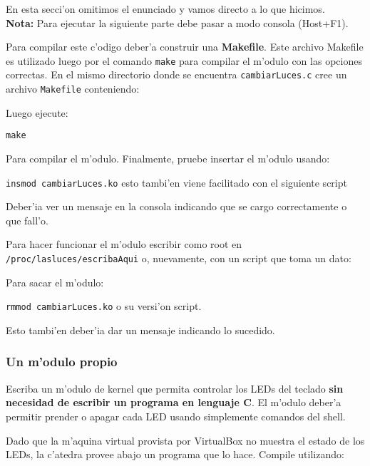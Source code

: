 \begin{envRespuesta}
En esta secci'on omitimos el enunciado y vamos directo a lo que hicimos. \\
\textbf{Nota:} Para ejecutar la siguiente parte debe pasar a modo consola (Host+F1).
\end{envRespuesta}


Para compilar este c'odigo deber'a construir una \textbf{Makefile}. Este archivo Makefile es utilizado luego por el
comando \texttt{make} para compilar el m'odulo con las opciones correctas. En el mismo directorio donde se encuentra
\texttt{cambiarLuces.c} cree un archivo \texttt{Makefile} conteniendo:


Luego ejecute:

\texttt{make}

Para compilar el m'odulo. Finalmente, pruebe insertar el m'odulo usando:

\texttt{insmod cambiarLuces.ko} esto tambi'en viene facilitado con el siguiente script

Deber'ia ver un mensaje en la consola indicando que se cargo correctamente o que fall'o.

Para hacer funcionar el m'odulo escribir como root en \texttt{/proc/lasluces/escribaAqui} o, nuevamente, con un script que toma un dato:


Para sacar el m'odulo:

\texttt{rmmod cambiarLuces.ko} o su versi'on script.


Esto tambi'en deber'ia dar un mensaje indicando lo sucedido.

\subsubsection{Un m'odulo propio}

Escriba un m'odulo de kernel que permita controlar los LEDs del teclado \textbf{sin necesidad de escribir un programa
en lenguaje C}. El m'odulo deber'a permitir prender o apagar cada LED usando simplemente comandos del shell.

Dado que la m'aquina virtual provista por VirtualBox no muestra el estado de los LEDs, la c'atedra provee abajo
un programa que lo hace. Compile utilizando:

